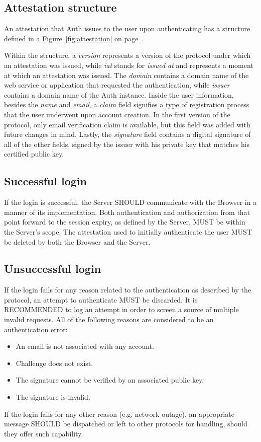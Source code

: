     \subsection{Attestation structure}
    An attestation that Auth issues to the user upon authenticating has a structure defined in a Figure~\ref{fig:attestation}
    on page~\pageref{fig:attestation}.
    
    Within the structure, a \textit{version} represents a version of the protocol under which an attestation was issued, 
    while \textit{iat} stands for \textit{issued at} and represents a moment at which an attestation was issued. The 
    \textit{domain} contains a domain name of the web service or application that requested the authentication, while 
    \textit{issuer} contains a domain name of the Auth instance. Inside the user information, besides the \textit{name}
    and \textit{email}, a \textit{claim} field signifies a type of registration process that the user underwent upon 
    account creation. In the first version of the protocol, only email verification claim is available, but this field 
    was added with future changes in mind. Lastly, the \textit{signature} field contains a digital signature of all of 
    the other fields, signed by the issuer with his private key that matches his certified public key. 

    \subsection{Successful login}
    If the login is successful, the Server SHOULD communicate with the Browser in a manner of its implementation. Both 
    authentication and authorization from that point forward to the session expiry, as defined by the Server, MUST be 
    within the Server's scope. The attestation used to initially authenticate the user MUST be deleted by both the Browser
    and the Server.

    \subsection{Unsuccessful login}
    If the login fails for any reason related to the authentication as described by the protocol, an attempt to 
    authenticate MUST be discarded. It is RECOMMENDED to log an attempt in order to screen a source of multiple invalid 
    requests. All of the following reasons are considered to be an authentication error:
        \begin{itemize}
            \item An email is not associated with any account.
            \item Challenge does not exist.
            \item The signature cannot be verified by an associated public key.
            \item The signature is invalid.
        \end{itemize}
    If the login fails for any other reason (e.g. network outage), an appropriate message SHOULD be dispatched or left 
    to other protocols for handling, should they offer such capability.

        

